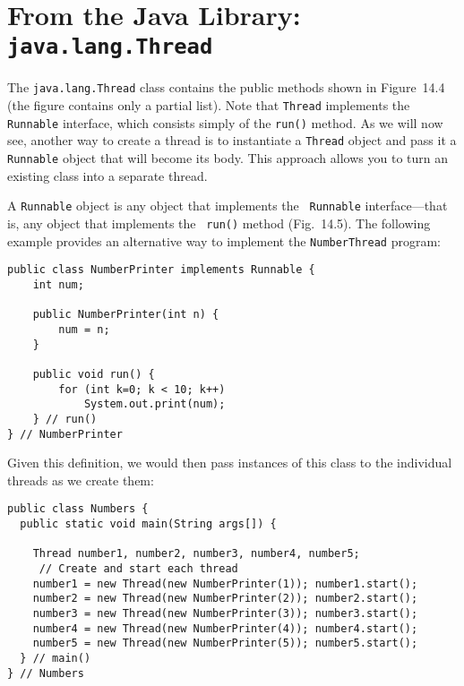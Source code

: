 
\section{From the Java Library: {\tt java.lang.Thread}}
{The} {\tt java.lang.Thread} class contains the public methods shown
in Figure~14.4 (the figure contains only a partial list).  Note that
{\tt Thread} implements the {\tt Runnable} interface, which consists
simply of the {\tt run()} method.  As we will now see, another way to
create a thread is to instantiate a {\tt Thread} object and pass it a
{\tt Runnable} object that will become its body. This approach allows
you to turn an existing class into a separate thread.

A {\tt Runnable} object is any object that implements the {\tt
Runnable} interface---that is, any object that implements the {\tt
run()} method (Fig.~14.5).  The following example provides an
alternative way to implement the {\tt NumberThread} program:

\begin{jjjlisting}
\begin{lstlisting}
public class NumberPrinter implements Runnable {
    int num;

    public NumberPrinter(int n) {
        num = n;
    }

    public void run() {
        for (int k=0; k < 10; k++)
            System.out.print(num);
    } // run()
} // NumberPrinter
\end{lstlisting}
\end{jjjlisting}

\noindent Given this definition, we would then pass instances of this class to
the individual threads as we create them:

\begin{jjjlisting}[29pc]
\begin{lstlisting}
public class Numbers {
  public static void main(String args[]) {

    Thread number1, number2, number3, number4, number5;
     // Create and start each thread
    number1 = new Thread(new NumberPrinter(1)); number1.start(); 
    number2 = new Thread(new NumberPrinter(2)); number2.start();
    number3 = new Thread(new NumberPrinter(3)); number3.start();
    number4 = new Thread(new NumberPrinter(4)); number4.start();
    number5 = new Thread(new NumberPrinter(5)); number5.start();
  } // main()
} // Numbers
\end{lstlisting}
\end{jjjlisting}

